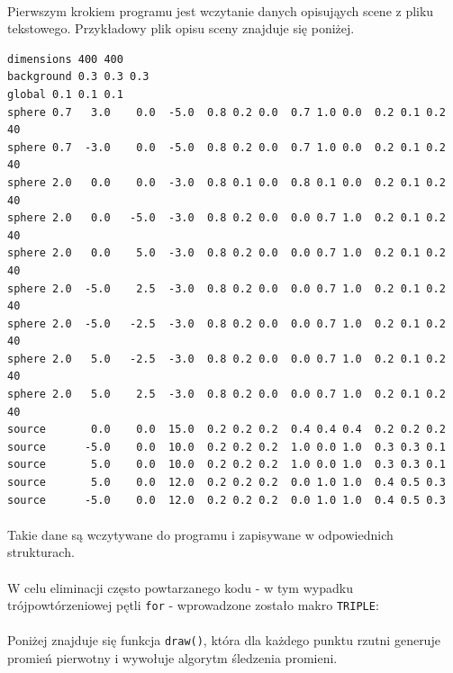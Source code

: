 \documentclass[wide,a4paper,titlepage,12pt] {article}
\begin{document}
  \paragraph{}
  Pierwszym krokiem programu jest wczytanie danych opisująych scene z pliku tekstowego. Przykładowy plik opisu sceny znajduje się poniżej.
  \begin{verbatim}
dimensions 400 400
background 0.3 0.3 0.3
global 0.1 0.1 0.1
sphere 0.7   3.0    0.0  -5.0  0.8 0.2 0.0  0.7 1.0 0.0  0.2 0.1 0.2  40
sphere 0.7  -3.0    0.0  -5.0  0.8 0.2 0.0  0.7 1.0 0.0  0.2 0.1 0.2  40
sphere 2.0   0.0    0.0  -3.0  0.8 0.1 0.0  0.8 0.1 0.0  0.2 0.1 0.2  40
sphere 2.0   0.0   -5.0  -3.0  0.8 0.2 0.0  0.0 0.7 1.0  0.2 0.1 0.2  40
sphere 2.0   0.0    5.0  -3.0  0.8 0.2 0.0  0.0 0.7 1.0  0.2 0.1 0.2  40
sphere 2.0  -5.0    2.5  -3.0  0.8 0.2 0.0  0.0 0.7 1.0  0.2 0.1 0.2  40
sphere 2.0  -5.0   -2.5  -3.0  0.8 0.2 0.0  0.0 0.7 1.0  0.2 0.1 0.2  40
sphere 2.0   5.0   -2.5  -3.0  0.8 0.2 0.0  0.0 0.7 1.0  0.2 0.1 0.2  40
sphere 2.0   5.0    2.5  -3.0  0.8 0.2 0.0  0.0 0.7 1.0  0.2 0.1 0.2  40
source       0.0    0.0  15.0  0.2 0.2 0.2  0.4 0.4 0.4  0.2 0.2 0.2
source      -5.0    0.0  10.0  0.2 0.2 0.2  1.0 0.0 1.0  0.3 0.3 0.1
source       5.0    0.0  10.0  0.2 0.2 0.2  1.0 0.0 1.0  0.3 0.3 0.1
source       5.0    0.0  12.0  0.2 0.2 0.2  0.0 1.0 1.0  0.4 0.5 0.3
source      -5.0    0.0  12.0  0.2 0.2 0.2  0.0 1.0 1.0  0.4 0.5 0.3
  \end{verbatim}
  \paragraph{}
  Takie dane są wczytywane do programu i zapisywane w odpowiednich strukturach.

  \paragraph{}
  


  \paragraph{}
  W celu eliminacji często powtarzanego kodu - w tym wypadku trójpowtórzeniowej pętli \texttt{for} - wprowadzone zostało makro \texttt{TRIPLE}:
  \paragraph{}
  

  \paragraph{}
  Poniżej znajduje się funkcja \texttt{draw()}, która dla każdego punktu rzutni generuje promień pierwotny i wywołuje algorytm śledzenia promieni.
\end{document}

